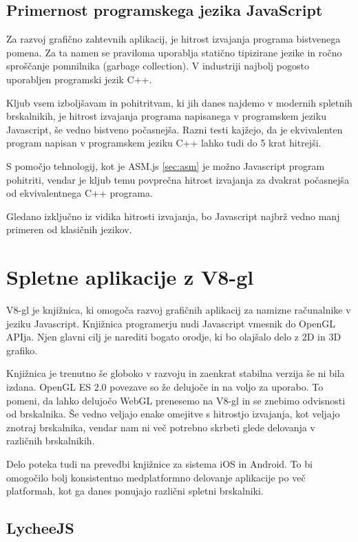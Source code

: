 \subsection{Primernost programskega jezika JavaScript}

Za razvoj grafično zahtevnih aplikacij, je hitrost izvajanja programa bistvenega pomena. Za ta namen se praviloma uporablja statično tipizirane jezike in ročno sproščanje pomnilnika (garbage collection). V industriji najbolj pogosto uporabljen programski jezik C++.

Kljub vsem izboljšavam in pohitritvam, ki jih danes najdemo v modernih spletnih brskalnikih, je hitrost izvajanja programa napisanega v programskem jeziku Javascript, še vedno bistveno počasnejša. Razni testi kajžejo, da je ekvivalenten program napisan v programskem jeziku C++ lahko tudi do 5 krat hitrejši.

S pomočjo tehnologij, kot je ASM.js \ref{sec:asm} je možno Javascript program pohitriti, vendar je kljub temu povprečna hitrost izvajanja za dvakrat počasnejša od ekvivalentnega C++ programa.

Gledano izključno iz vidika hitrosti izvajanja, bo Javascript najbrž vedno manj primeren od klasičnih jezikov.

\section{Spletne aplikacije z V8-gl}

V8-gl je knjižnica, ki omogoča razvoj grafičnih aplikacij za namizne računalnike v jeziku Javascript. Knjižnica programerju nudi Javascript vmesnik do OpenGL APIja. Njen glavni cilj je narediti bogato orodje, ki bo olajšalo delo z 2D in 3D grafiko.

Knjižnica je trenutno še globoko v razvoju in zaenkrat stabilna verzija še ni bila izdana. OpenGL ES 2.0 povezave so že delujoče in na voljo za uporabo. To pomeni, da lahko delujočo WebGL prenesemo na V8-gl in se znebimo odvisnosti od brskalnika. Še vedno veljajo enake omejitve s hitrostjo izvajanja, kot veljajo znotraj brskalnika, vendar nam ni več potrebno skrbeti glede delovanja v različnih brskalnikih.

Delo poteka tudi na prevedbi knjižnice za sistema iOS in Android. To bi omogočilo bolj konsistentno medplatformno delovanje aplikacije po več platformah, kot ga danes ponujajo različni spletni brskalniki.

\subsection{LycheeJS}


